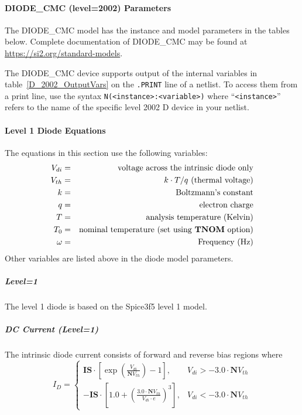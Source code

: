 



\paragraph{DIODE\_CMC (level=2002) Parameters}
The DIODE\_CMC model has the instance and model parameters in the
tables below.  Complete documentation of DIODE\_CMC may be found at
\url{https://si2.org/standard-models}.


The DIODE\_CMC device supports output of the internal variables in
table~\ref{D_2002_OutputVars} on the \texttt{.PRINT} line of a netlist.
To access them from a print line, use the syntax
\texttt{N(<instance>:<variable>)} where ``\texttt{<instance>}'' refers to the
name of the specific level 2002 D device in your netlist.





\paragraph{Level 1 Diode Equations}

The equations in this section use the following variables:
\begin{eqnarray*}
V_{di} & = & \mbox{voltage across the intrinsic diode only} \\
V_{th} & = & \mbox{$k \cdot T/q$ (thermal voltage)}         \\
k      & = & \mbox{Boltzmann's constant}                    \\
q      & = & \mbox{electron charge}                         \\
T      & = & \mbox{analysis temperature (Kelvin)}           \\
T_{0}  & = & \mbox{nominal temperature (set using \textrm{\textbf{TNOM}}
option)} \\
\omega & = & \mbox{Frequency (Hz)}
\end{eqnarray*}
Other variables are listed above in the diode model parameters.

\subparagraph{Level=1}
The level 1 diode is based on the Spice3f5 level 1 model.

\subparagraph{DC Current (Level=1)}

The intrinsic diode current consists of forward and reverse bias regions where
$$
I_D = \left\{ \begin{array}{ll}
\mathbf{IS}\cdot\left[\exp \left(\frac{V_{di}}{\mathbf{N}V_{th}}\right) - 1
\right], & V_{di} > -3.0\cdot\mathbf{N}V_{th} \\
-\mathbf{IS}\cdot\left[1.0 + \left(\frac{3.0\cdot\mathbf{N}V_{th}}{V_{di}\cdot
e}\right)^3\right], & V_{di} < -3.0\cdot\mathbf{N}V_{th}
\end{array}
\right.
$$


